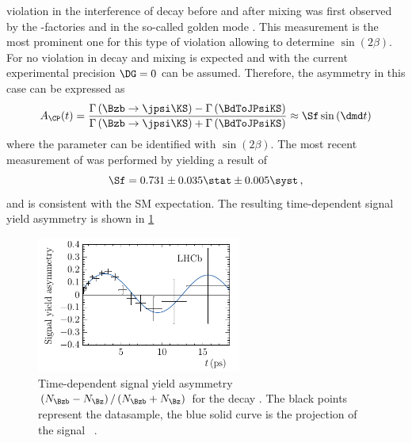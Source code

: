 \CP violation in the interference of decay before and after mixing was first observed by the \B-factories \babar \cite{Aubert:2001nu} and \belle \cite{Abe:2001xe} in the so-called golden mode \BdToJPsiKS.
This measurement is the most prominent one for this type of \CP violation allowing to determine $\sin\!\left(2\beta\right)$.
For \BdToJPsiKS no \CP violation in decay and mixing is expected and with the current experimental precision $\DG=0$ can be assumed.
Therefore, the \CP asymmetry in this case can be expressed as
\begin{equation}
A_{\CP}(t)=\frac{\Gamma\left(\Bzb\to\jpsi\KS\right)-\Gamma\left(\BdToJPsiKS\right)}{\Gamma\left(\Bzb\to\jpsi\KS\right)+\Gamma\left(\BdToJPsiKS\right)}\approx\Sf\sin\left(\dmd t\right)\label{eq:CPAsymBd2JpsiKS}
\end{equation}
where the parameter \Sf can be identified with $\sin{}\left(2\beta\right)$.
The most recent measurement of \Sf was performed by \lhcb \cite{Aaij:2015vza} yielding a result of
\begin{equation}
\Sf=0.731\pm0.035\stat\pm0.005\syst\,,
\end{equation}
and is consistent with the \ac{SM} expectation. The resulting time-dependent signal yield asymmetry is shown in \cref{fig:sin2beta}
\begin{figure}[tb]
	\centering
	\includegraphics[width=0.6\textwidth]{03CPV/figs/InterferenceCPV.pdf}
	\caption{Time-dependent signal yield asymmetry $\left(N_{\Bzb}-N_{\Bz}\right)/\left(N_{\Bzb}+N_{\Bz}\right)$ for the decay \BdToJPsiKS.
	The black points represent the datasample, the blue solid curve is the projection of the signal \PDF~\cite{Aaij:2015vza}.}
	\label{fig:sin2beta}
\end{figure}
